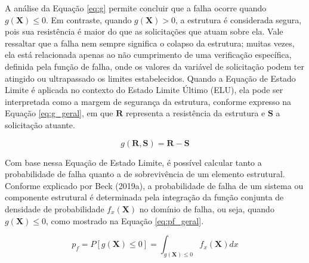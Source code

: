 A análise da Equação \eqref{eq:g} permite concluir que a falha ocorre quando $g(\textbf{X})\leq0$. Em contraste, quando $g(\textbf{X}) > 0$, a estrutura é considerada segura, pois sua resistência é maior do que as solicitações que atuam sobre ela. Vale ressaltar que a falha nem sempre significa o colapso da estrutura; muitas vezes, ela está relacionada apenas ao não cumprimento de uma verificação específica, definida pela função de falha, onde os valores da variável de solicitação podem ter atingido ou ultrapassado os limites estabelecidos. Quando a Equação de Estado Limite é aplicada no contexto do Estado Limite Último (ELU), ela pode ser interpretada como a margem de segurança da estrutura, conforme expresso na Equação \eqref{eq:g_geral}, em que $\textbf{R}$ representa a resistência da estrutura e $\textbf{S}$ a solicitação atuante.

\begin{equation}\label{eq:g_geral}
g(\mathbf{R}, \mathbf{S}) = \textbf{R} - \textbf{S}
\end{equation} 

Com base nessa Equação de Estado Limite, é possível calcular tanto a probabilidade de falha quanto a de sobrevivência de um elemento estrutural. Conforme explicado por Beck (2019a), a probabilidade de falha de um sistema ou componente estrutural é determinada pela integração da função conjunta de densidade de probabilidade $f_x(\textbf{X})$ no domínio de falha, ou seja, quando $g(\textbf{X})\leq0$, como mostrado na Equação \eqref{eq:pf_geral}.

\begin{equation}\label{eq:pf_geral}
p_f = P[g(\mathbf{X})\leq 0] = \int_{g(\mathbf{X})\leq 0} f_x(\textbf{X}) dx
\end{equation}




